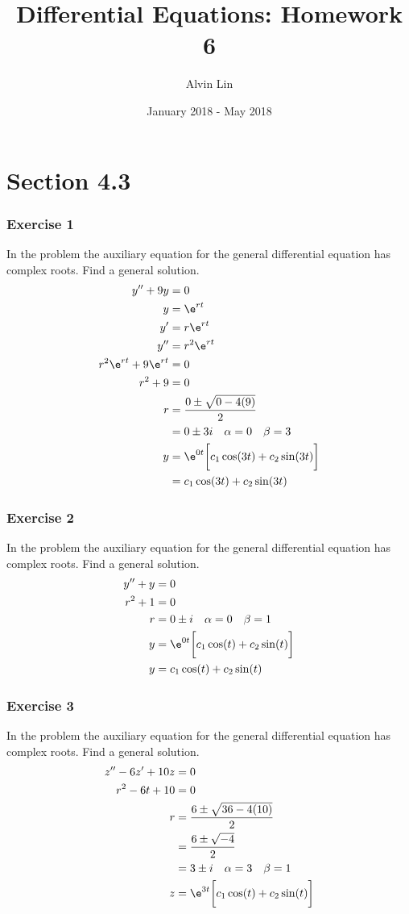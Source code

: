 \documentclass{math}
\title{Differential Equations: Homework 6}
\author{Alvin Lin}
\date{January 2018 - May 2018}
\begin{document}
\maketitle
\clearpage

\section*{Section 4.3}

\subsubsection*{Exercise 1}
In the problem the auxiliary equation for the general differential equation has
complex roots. Find a general solution.
\begin{align*}
  y''+9y &= 0 \\
  y &= \e^{rt} \\
  y' &= r\e^{rt} \\
  y'' &= r^2\e^{rt} \\
  r^2\e^{rt}+9\e^{rt} &= 0 \\
  r^2+9 &= 0 \\
  r &= \frac{0\pm\sqrt{0-4(9)}}{2} \\
  &= 0\pm3i \quad \alpha = 0 \quad \beta = 3 \\
  y &= \e^{0t}\bigg[c_1\cos(3t)+c_2\sin(3t)\bigg] \\
  &= c_1\cos(3t)+c_2\sin(3t)
\end{align*}

\subsubsection*{Exercise 2}
In the problem the auxiliary equation for the general differential equation has
complex roots. Find a general solution.
\begin{align*}
  y''+y &= 0 \\
  r^2+1 &= 0 \\
  r &= 0\pm i \quad \alpha = 0 \quad \beta = 1 \\
  y &= \e^{0t}\bigg[c_1\cos(t)+c_2\sin(t)\bigg] \\
  y &= c_1\cos(t)+c_2\sin(t)
\end{align*}

\subsubsection*{Exercise 3}
In the problem the auxiliary equation for the general differential equation has
complex roots. Find a general solution.
\begin{align*}
  z''-6z'+10z &= 0 \\
  r^2-6t+10 &= 0 \\
  r &= \frac{6\pm\sqrt{36-4(10)}}{2} \\
  &= \frac{6\pm\sqrt{-4}}{2} \\
  &= 3\pm i \quad \alpha = 3 \quad \beta = 1 \\
  z &= \e^{3t}\bigg[c_1\cos(t)+c_2\sin(t)\bigg]
\end{align*}
\end{document}
